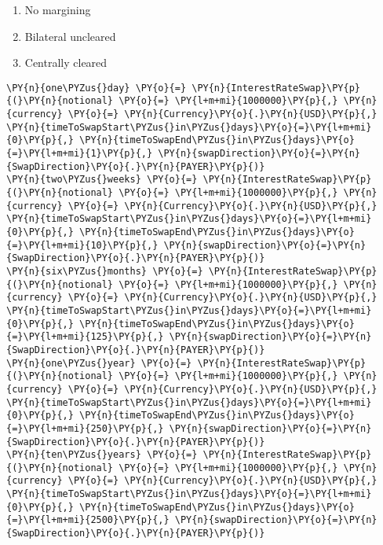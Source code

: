 \begin{enumerate}
\def\labelenumi{\arabic{enumi}.}
\tightlist
\item
  No margining
\item
  Bilateral uncleared
\item
  Centrally cleared
\end{enumerate}

    \begin{tcolorbox}[breakable, size=fbox, boxrule=1pt, pad at break*=1mm,colback=cellbackground, colframe=cellborder]
\begin{Verbatim}[commandchars=\\\{\}]
\PY{n}{one\PYZus{}day} \PY{o}{=} \PY{n}{InterestRateSwap}\PY{p}{(}\PY{n}{notional} \PY{o}{=} \PY{l+m+mi}{1000000}\PY{p}{,} \PY{n}{currency} \PY{o}{=} \PY{n}{Currency}\PY{o}{.}\PY{n}{USD}\PY{p}{,} \PY{n}{timeToSwapStart\PYZus{}in\PYZus{}days}\PY{o}{=}\PY{l+m+mi}{0}\PY{p}{,} \PY{n}{timeToSwapEnd\PYZus{}in\PYZus{}days}\PY{o}{=}\PY{l+m+mi}{1}\PY{p}{,} \PY{n}{swapDirection}\PY{o}{=}\PY{n}{SwapDirection}\PY{o}{.}\PY{n}{PAYER}\PY{p}{)}
\PY{n}{two\PYZus{}weeks} \PY{o}{=} \PY{n}{InterestRateSwap}\PY{p}{(}\PY{n}{notional} \PY{o}{=} \PY{l+m+mi}{1000000}\PY{p}{,} \PY{n}{currency} \PY{o}{=} \PY{n}{Currency}\PY{o}{.}\PY{n}{USD}\PY{p}{,} \PY{n}{timeToSwapStart\PYZus{}in\PYZus{}days}\PY{o}{=}\PY{l+m+mi}{0}\PY{p}{,} \PY{n}{timeToSwapEnd\PYZus{}in\PYZus{}days}\PY{o}{=}\PY{l+m+mi}{10}\PY{p}{,} \PY{n}{swapDirection}\PY{o}{=}\PY{n}{SwapDirection}\PY{o}{.}\PY{n}{PAYER}\PY{p}{)}
\PY{n}{six\PYZus{}months} \PY{o}{=} \PY{n}{InterestRateSwap}\PY{p}{(}\PY{n}{notional} \PY{o}{=} \PY{l+m+mi}{1000000}\PY{p}{,} \PY{n}{currency} \PY{o}{=} \PY{n}{Currency}\PY{o}{.}\PY{n}{USD}\PY{p}{,} \PY{n}{timeToSwapStart\PYZus{}in\PYZus{}days}\PY{o}{=}\PY{l+m+mi}{0}\PY{p}{,} \PY{n}{timeToSwapEnd\PYZus{}in\PYZus{}days}\PY{o}{=}\PY{l+m+mi}{125}\PY{p}{,} \PY{n}{swapDirection}\PY{o}{=}\PY{n}{SwapDirection}\PY{o}{.}\PY{n}{PAYER}\PY{p}{)}
\PY{n}{one\PYZus{}year} \PY{o}{=} \PY{n}{InterestRateSwap}\PY{p}{(}\PY{n}{notional} \PY{o}{=} \PY{l+m+mi}{1000000}\PY{p}{,} \PY{n}{currency} \PY{o}{=} \PY{n}{Currency}\PY{o}{.}\PY{n}{USD}\PY{p}{,} \PY{n}{timeToSwapStart\PYZus{}in\PYZus{}days}\PY{o}{=}\PY{l+m+mi}{0}\PY{p}{,} \PY{n}{timeToSwapEnd\PYZus{}in\PYZus{}days}\PY{o}{=}\PY{l+m+mi}{250}\PY{p}{,} \PY{n}{swapDirection}\PY{o}{=}\PY{n}{SwapDirection}\PY{o}{.}\PY{n}{PAYER}\PY{p}{)}
\PY{n}{ten\PYZus{}years} \PY{o}{=} \PY{n}{InterestRateSwap}\PY{p}{(}\PY{n}{notional} \PY{o}{=} \PY{l+m+mi}{1000000}\PY{p}{,} \PY{n}{currency} \PY{o}{=} \PY{n}{Currency}\PY{o}{.}\PY{n}{USD}\PY{p}{,} \PY{n}{timeToSwapStart\PYZus{}in\PYZus{}days}\PY{o}{=}\PY{l+m+mi}{0}\PY{p}{,} \PY{n}{timeToSwapEnd\PYZus{}in\PYZus{}days}\PY{o}{=}\PY{l+m+mi}{2500}\PY{p}{,} \PY{n}{swapDirection}\PY{o}{=}\PY{n}{SwapDirection}\PY{o}{.}\PY{n}{PAYER}\PY{p}{)}


\end{Verbatim}
\end{tcolorbox}
